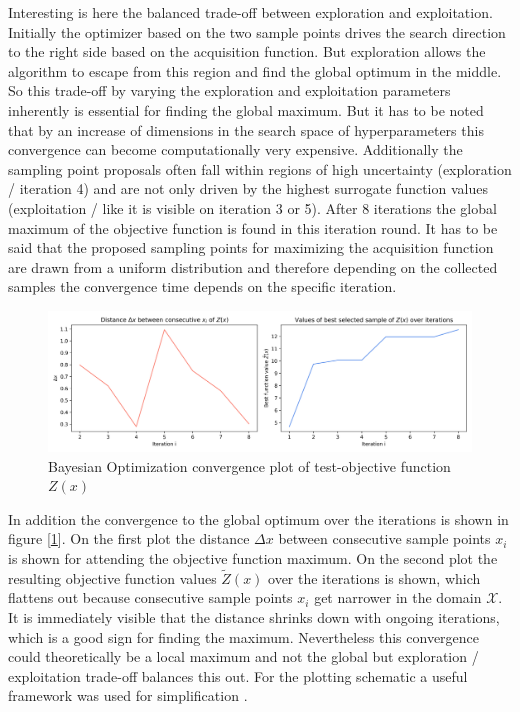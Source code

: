 \documentclass[12pt, a4paper]{article}
\begin{document}
Interesting is here the balanced trade-off between exploration and exploitation. Initially the optimizer based on the two sample points drives the search direction to the right side based on the acquisition function. But exploration allows the algorithm to escape from this region and find the global optimum in the middle. So this trade-off by varying the exploration and exploitation parameters inherently is essential for finding the global maximum. But it has to be noted that by an increase of dimensions in the search space of hyperparameters this convergence can become computationally very expensive. Additionally the sampling point proposals often fall within regions of high uncertainty (exploration / iteration 4) and are not only driven by the highest surrogate function values (exploitation / like it is visible on iteration 3 or 5). After 8 iterations the global maximum of the objective function is found in this iteration round. It has to be said that the proposed sampling points for maximizing the acquisition function are drawn from a uniform distribution and therefore depending on the collected samples the convergence time depends on the specific iteration. \\
\begin{figure}[!htpb]
    \centering
    \includegraphics[width=1\textwidth,trim={0 0 0 0},clip]{figures/bayesian_optimization_from_scratch_convergence_plot_0.png}
    \caption[Bayesian Optimization convergence plot]{Bayesian Optimization convergence plot of test-objective function $Z(x)$}
    \label{fig: bo_convergence_plot}
\end{figure}
In addition the convergence to the global optimum over the iterations is shown in figure [\ref{fig: bo_convergence_plot}]. On the first plot the distance $\Delta{x}$ between consecutive sample points $x_i$ is shown for attending the objective function maximum. On the second plot the resulting objective function values $\tilde{Z}(x)$ over the iterations is shown, which flattens out because consecutive sample points $x_i$ get narrower in the domain $\mathcal{X}$. It is immediately visible that the distance shrinks down with ongoing iterations, which is a good sign for finding the maximum. Nevertheless this convergence could theoretically be a local maximum and not the global but exploration / exploitation trade-off balances this out. For the plotting schematic a useful framework was used for simplification \cite{Pradeep}.
\newpage
\end{document}
